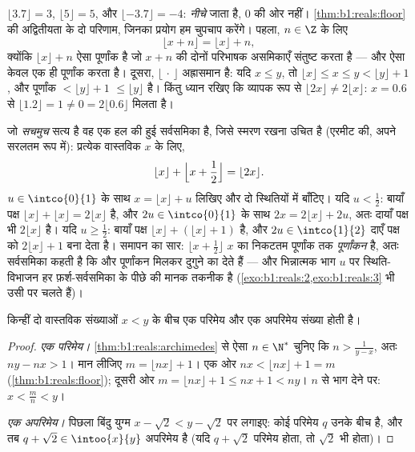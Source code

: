 \begin{example}[व्यवहार में फ़र्श]\label{ex:b1:reals:floorpractice}
$\lfloor 3.7 \rfloor = 3$, $\lfloor 5 \rfloor = 5$, और $\lfloor -3.7 \rfloor
= -4$:  \emph{नीचे} जाता है, $0$ की ओर नहीं। \cref{thm:b1:reals:floor}
की अद्वितीयता के दो परिणाम, जिनका प्रयोग हम चुपचाप करेंगे। पहला, $n \in \Z$
के लिए
\[
\lfloor x + n \rfloor = \lfloor x \rfloor + n ,
\]
क्योंकि $\lfloor x \rfloor + n$ ऐसा पूर्णांक है जो $x + n$ की दोनों परिभाषक
असमिकाएँ संतुष्ट करता है --- और ऐसा केवल एक ही पूर्णांक करता है। दूसरा,
$\lfloor \, \cdot \, \rfloor$ अह्रासमान है: यदि $x \leq y$, तो $\lfloor x
\rfloor \leq x \leq y < \lfloor y \rfloor + 1$, और पूर्णांक $< \lfloor y
\rfloor + 1$ $\leq \lfloor y \rfloor$ है। किंतु ध्यान रखिए कि व्यापक रूप से
$\lfloor 2x \rfloor \neq 2\lfloor x \rfloor$: $x = 0.6$ से $\lfloor 1.2
\rfloor = 1 \neq 0 = 2\lfloor 0.6 \rfloor$ मिलता है।

जो \emph{सचमुच} सत्य है वह एक हल की हुई सर्वसमिका है, जिसे स्मरण रखना उचित
है (एरमीट की, अपने सरलतम रूप में): प्रत्येक वास्तविक $x$ के लिए,
\[
\lfloor x \rfloor + \Bigl\lfloor x + \frac12 \Bigr\rfloor
= \lfloor 2x \rfloor .
\]
$u \in \intco{0}{1}$ के साथ $x = \lfloor x\rfloor + u$ लिखिए और दो स्थितियों
में बाँटिए। यदि $u < \frac12$: बायाँ पक्ष $\lfloor x\rfloor + \lfloor
x\rfloor = 2\lfloor x\rfloor$ है, और $2u \in \intco{0}{1}$ के साथ $2x =
2\lfloor x\rfloor + 2u$, अतः दायाँ पक्ष भी $2\lfloor x\rfloor$ है। यदि $u
\geq \frac12$: बायाँ पक्ष $\lfloor x\rfloor + (\lfloor x\rfloor + 1)$ है, और
$2u \in \intco{1}{2}$ दाएँ पक्ष को $2\lfloor x\rfloor + 1$ बना देता है।
समापन का सार: $\lfloor x + \frac12\rfloor$ $x$ का निकटतम पूर्णांक तक
\emph{पूर्णांकन} है, अतः सर्वसमिका कहती है कि  और पूर्णांकन मिलकर
दुगुने का  देते हैं --- और भिन्नात्मक भाग $u$ पर स्थिति-विभाजन हर
फ़र्श-सर्वसमिका के पीछे की मानक तकनीक है
(\cref{exo:b1:reals:2,exo:b1:reals:3} भी उसी पर चलते हैं)।
\end{example}

\begin{theorem}\label{thm:b1:reals:density}
किन्हीं दो वास्तविक संख्याओं $x < y$ के बीच एक परिमेय और एक अपरिमेय संख्या
होती है।
\end{theorem}

\begin{proof}
\emph{एक परिमेय।} \cref{thm:b1:reals:archimedes} से ऐसा $n \in \N^*$ चुनिए
कि $n > \frac{1}{y - x}$, अतः $ny - nx > 1$। मान लीजिए $m = \lfloor nx
\rfloor + 1$। एक ओर $nx < \lfloor nx \rfloor + 1 = m$
(\cref{thm:b1:reals:floor}); दूसरी ओर $m = \lfloor nx \rfloor + 1 \leq nx +
1 < ny$। $n$ से भाग देने पर: $x < \frac mn < y$।

\emph{एक अपरिमेय।} पिछला बिंदु युग्म $x - \sqrt 2 < y - \sqrt 2$ पर लगाइए:
कोई परिमेय $q$ उनके बीच है, और तब $q + \sqrt 2 \in \intoo{x}{y}$ अपरिमेय है
(यदि $q + \sqrt 2$ परिमेय होता, तो $\sqrt 2$ भी होता)।
\end{proof}

